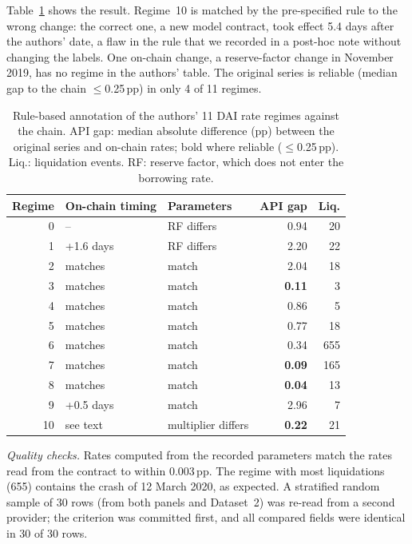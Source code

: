 \documentclass[11pt]{article}
\newcommand{\pp}{\,pp}
\begin{document}
Table~\ref{tab:regimes} shows the result. Regime~10 is matched by the pre-specified rule to the wrong change: the correct one, a new model contract, took effect 5.4 days after the authors' date, a flaw in the rule that we recorded in a post-hoc note without changing the labels. One on-chain change, a reserve-factor change in November 2019, has no regime in the authors' table. The original series is reliable (median gap to the chain $\le$0.25\pp) in only 4 of 11 regimes.

\begin{table}[t]
\centering\small
\setlength{\tabcolsep}{3pt}
\begin{tabular}{@{}rllrr@{}}
\toprule
Regime & On-chain timing & Parameters & API gap & Liq. \\
\midrule
0 & -- & RF differs & 0.94 & 20 \\
1 & +1.6 days & RF differs & 2.20 & 22 \\
2 & matches & match & 2.04 & 18 \\
3 & matches & match & \textbf{0.11} & 3 \\
4 & matches & match & 0.86 & 5 \\
5 & matches & match & 0.77 & 18 \\
6 & matches & match & 0.34 & 655 \\
7 & matches & match & \textbf{0.09} & 165 \\
8 & matches & match & \textbf{0.04} & 13 \\
9 & +0.5 days & match & 2.96 & 7 \\
10 & see text & multiplier differs & \textbf{0.22} & 21 \\
\bottomrule
\end{tabular}
\caption{Rule-based annotation of the authors' 11 DAI rate regimes against the chain. API gap: median absolute difference (pp) between the original series and on-chain rates; bold where reliable ($\le$0.25\pp). Liq.: liquidation events. RF: reserve factor, which does not enter the borrowing rate.}
\label{tab:regimes}
\end{table}

\emph{Quality checks.} Rates computed from the recorded parameters match the rates read from the contract to within 0.003\pp. The regime with most liquidations (655) contains the crash of 12 March 2020, as expected. A stratified random sample of 30 rows (from both panels and Dataset~2) was re-read from a second provider; the criterion was committed first, and all compared fields were identical in 30 of 30 rows.
\end{document}

